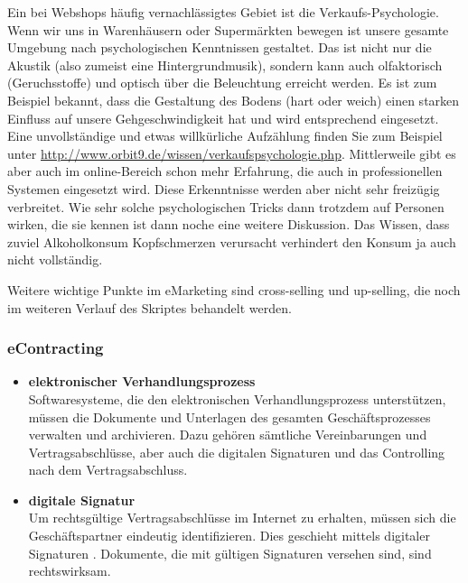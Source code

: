 Ein bei Webshops häufig vernachlässigtes Gebiet ist die Verkaufs-Psychologie.
Wenn wir uns in Warenhäusern oder Supermärkten bewegen ist unsere gesamte
Umgebung nach psychologischen Kenntnissen gestaltet. Das ist nicht nur
die Akustik (also zumeist eine Hintergrundmusik), sondern kann auch
olfaktorisch (Geruchsstoffe) und optisch über die Beleuchtung erreicht
werden. Es ist zum Beispiel bekannt, dass die Gestaltung des Bodens
(hart oder weich) einen starken Einfluss auf unsere Gehgeschwindigkeit hat
und wird entsprechend eingesetzt. Eine unvollständige und etwas willkürliche
Aufzählung finden Sie zum Beispiel unter
\href{http://www.orbit9.de/wissen/verkaufspsychologie.php}
{http://www.orbit9.de/wissen/verkaufspsychologie.php}.
Mittlerweile gibt es aber auch im online-Bereich schon mehr Erfahrung,
die auch in professionellen Systemen eingesetzt wird. Diese Erkenntnisse
werden aber nicht sehr freizügig verbreitet. Wie sehr solche psychologischen
Tricks dann trotzdem auf Personen wirken, die sie kennen ist dann noche
eine weitere Diskussion. Das Wissen, dass zuviel Alkoholkonsum Kopfschmerzen
verursacht verhindert den Konsum ja auch nicht vollständig.

Weitere wichtige Punkte im eMarketing sind cross-selling und up-selling,
die noch im weiteren Verlauf des Skriptes behandelt werden.

\subsubsection*{eContracting}

\begin{itemize}
    \item\textbf{elektronischer Verhandlungsprozess} \\
    Softwaresysteme, die den elektronischen Verhandlungsprozess
    unterstützen, müssen die Dokumente und Unterlagen des gesamten
    Geschäftsprozesses verwalten und archivieren. Dazu gehören sämtliche
    Vereinbarungen und Vertragsabschlüsse, aber auch die digitalen
    Signaturen und das Controlling nach dem Vertragsabschluss.
    \item\textbf{digitale Signatur} \\
    Um rechtsgültige Vertragsabschlüsse im Internet zu erhalten,
    müssen sich die Geschäftspartner eindeutig identifizieren.
    Dies geschieht mittels digitaler Signaturen .
    Dokumente, die mit gültigen Signaturen versehen sind, sind rechtswirksam.
\end{itemize}

